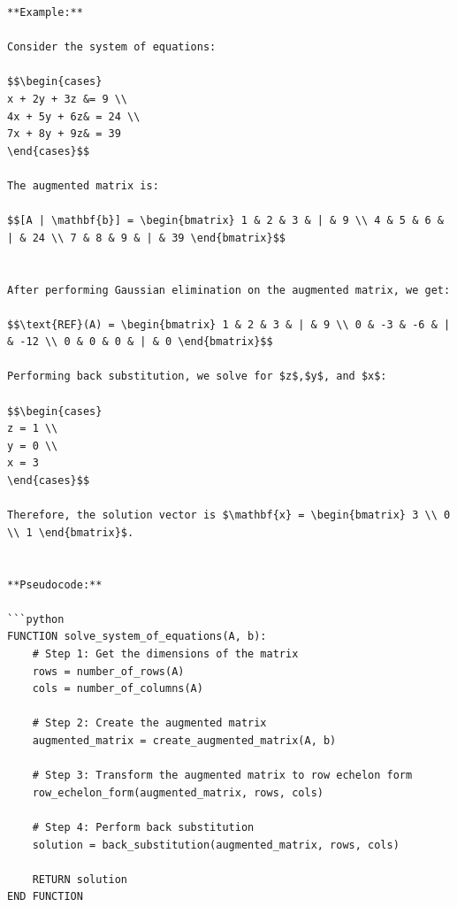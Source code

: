 \documentclass[
  letterpaper,
  DIV=11,
  numbers=noendperiod]{scrreprt}
\theoremstyle{plain}
\theoremstyle{definition}
\theoremstyle{remark}
\begin{document}
\begin{verbatim}
**Example:**

Consider the system of equations:

$$\begin{cases}
x + 2y + 3z &= 9 \\
4x + 5y + 6z& = 24 \\
7x + 8y + 9z& = 39
\end{cases}$$

The augmented matrix is:

$$[A | \mathbf{b}] = \begin{bmatrix} 1 & 2 & 3 & | & 9 \\ 4 & 5 & 6 & | & 24 \\ 7 & 8 & 9 & | & 39 \end{bmatrix}$$


After performing Gaussian elimination on the augmented matrix, we get:

$$\text{REF}(A) = \begin{bmatrix} 1 & 2 & 3 & | & 9 \\ 0 & -3 & -6 & | & -12 \\ 0 & 0 & 0 & | & 0 \end{bmatrix}$$

Performing back substitution, we solve for $z$,$y$, and $x$:

$$\begin{cases}
z = 1 \\
y = 0 \\
x = 3
\end{cases}$$

Therefore, the solution vector is $\mathbf{x} = \begin{bmatrix} 3 \\ 0 \\ 1 \end{bmatrix}$.


**Pseudocode:**

```python
FUNCTION solve_system_of_equations(A, b):
    # Step 1: Get the dimensions of the matrix
    rows = number_of_rows(A)
    cols = number_of_columns(A)
    
    # Step 2: Create the augmented matrix
    augmented_matrix = create_augmented_matrix(A, b)
    
    # Step 3: Transform the augmented matrix to row echelon form
    row_echelon_form(augmented_matrix, rows, cols)
    
    # Step 4: Perform back substitution
    solution = back_substitution(augmented_matrix, rows, cols)
    
    RETURN solution
END FUNCTION


\end{verbatim}
\end{document}
